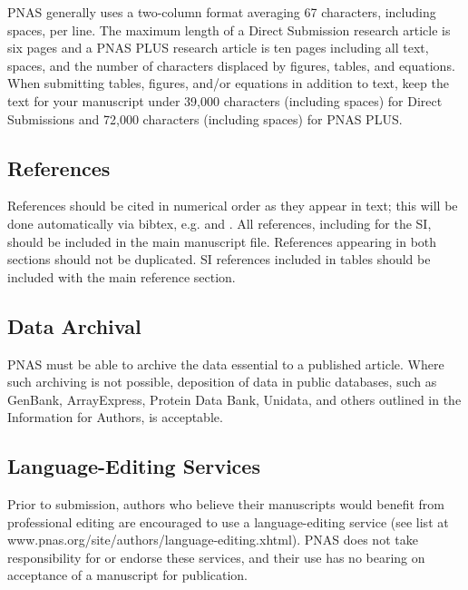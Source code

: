 \documentclass[9pt,twocolumn,twoside]{pnas-new}
\begin{document}
PNAS generally uses a two-column format averaging 67 characters, including spaces, per line. The maximum length of a Direct Submission research article is six pages and a PNAS PLUS research article is ten pages including all text, spaces, and the number of characters displaced by figures, tables, and equations.  When submitting tables, figures, and/or equations in addition to text, keep the text for your manuscript under 39,000 characters (including spaces) for Direct Submissions and 72,000 characters (including spaces) for PNAS PLUS.

\subsection*{References}

References should be cited in numerical order as they appear in text; this will be done automatically via bibtex, e.g. \cite{belkin2002using} and \cite{berard1994embedding,coifman2005geometric}. All references, including for the SI, should be included in the main manuscript file. References appearing in both sections should not be duplicated.  SI references included in tables should be included with the main reference section. 

\subsection*{Data Archival}

PNAS must be able to archive the data essential to a published article. Where such archiving is not possible, deposition of data in public databases, such as GenBank, ArrayExpress, Protein Data Bank, Unidata, and others outlined in the Information for Authors, is acceptable.

\subsection*{Language-Editing Services}
Prior to submission, authors who believe their manuscripts would benefit from professional editing are encouraged to use a language-editing service (see list at www.pnas.org/site/authors/language-editing.xhtml). PNAS does not take responsibility for or endorse these services, and their use has no bearing on acceptance of a manuscript for publication. 
\end{document}
